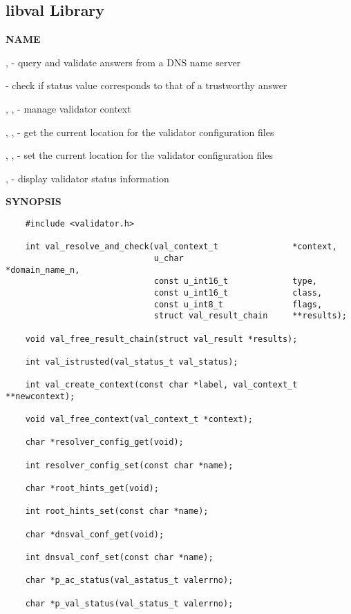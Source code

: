 \clearpage

\subsection{\bf libval Library}

{\bf NAME}

,  - query
and validate answers from a DNS name server

 - check if status value corresponds to that of a
trustworthy answer

, ,
 - manage validator context

, ,
 - get the current location for the validator
configuration files

, ,
 - set the current location for the validator
configuration files

,  - display validator status
information

{\bf SYNOPSIS}

\begin{verbatim}
    #include <validator.h>

    int val_resolve_and_check(val_context_t               *context,
                              u_char                      *domain_name_n,
                              const u_int16_t             type,
                              const u_int16_t             class,
                              const u_int8_t              flags,
                              struct val_result_chain     **results);

    void val_free_result_chain(struct val_result *results);

    int val_istrusted(val_status_t val_status);

    int val_create_context(const char *label, val_context_t **newcontext);

    void val_free_context(val_context_t *context);

    char *resolver_config_get(void);

    int resolver_config_set(const char *name);

    char *root_hints_get(void);

    int root_hints_set(const char *name);

    char *dnsval_conf_get(void);

    int dnsval_conf_set(const char *name);

    char *p_ac_status(val_astatus_t valerrno);

    char *p_val_status(val_status_t valerrno);
\end{verbatim}

